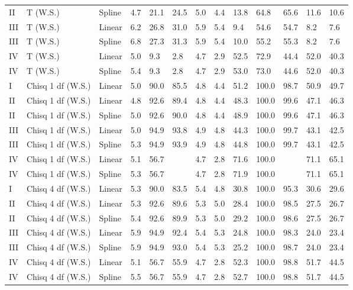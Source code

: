 \documentclass{article}\usepackage[]{graphicx}\usepackage[]{color}
\begin{document}
\begin{table}[ht]
\begin{tabular}{lll|lllll|lllll}
  II & T (W.S.) & Spline & 4.7 & 21.1 & 24.5 & 5.0 & 4.4 & 13.8 & 64.8 & 65.6 & 11.6 & 10.6 \\ 
  III & T (W.S.) & Linear & 6.2 & 26.8 & 31.0 & 5.9 & 5.4 & 9.4 & 54.6 & 54.7 & 8.2 & 7.6 \\ 
  III & T (W.S.) & Spline & 6.8 & 27.3 & 31.3 & 5.9 & 5.4 & 10.0 & 55.2 & 55.3 & 8.2 & 7.6 \\ 
  IV & T (W.S.) & Linear & 5.0 & 9.3 & 2.8 & 4.7 & 2.9 & 52.5 & 72.9 & 44.4 & 52.0 & 40.3 \\ 
  IV & T (W.S.) & Spline & 5.4 & 9.3 & 2.8 & 4.7 & 2.9 & 53.0 & 73.0 & 44.6 & 52.0 & 40.3 \\ 
   \hline
I & Chisq 1 df (W.S.) & Linear & 5.0 & 90.0 & 85.5 & 4.8 & 4.4 & 51.2 & 100.0 & 98.7 & 50.9 & 49.7 \\ 
  II & Chisq 1 df (W.S.) & Linear & 4.8 & 92.6 & 89.4 & 4.8 & 4.4 & 48.3 & 100.0 & 99.6 & 47.1 & 46.3 \\ 
  II & Chisq 1 df (W.S.) & Spline & 5.0 & 92.6 & 90.0 & 4.8 & 4.4 & 48.9 & 100.0 & 99.6 & 47.1 & 46.3 \\ 
  III & Chisq 1 df (W.S.) & Linear & 5.0 & 94.9 & 93.8 & 4.9 & 4.8 & 44.3 & 100.0 & 99.7 & 43.1 & 42.5 \\ 
  III & Chisq 1 df (W.S.) & Spline & 5.3 & 94.9 & 93.9 & 4.9 & 4.8 & 44.8 & 100.0 & 99.7 & 43.1 & 42.5 \\ 
  IV & Chisq 1 df (W.S.) & Linear & 5.1 & 56.7 &  & 4.7 & 2.8 & 71.6 & 100.0 &  & 71.1 & 65.1 \\ 
  IV & Chisq 1 df (W.S.) & Spline & 5.3 & 56.7 &  & 4.7 & 2.8 & 71.9 & 100.0 &  & 71.1 & 65.1 \\ 
   \hline
I & Chisq 4 df (W.S.) & Linear & 5.3 & 90.0 & 83.5 & 5.4 & 4.8 & 30.8 & 100.0 & 95.3 & 30.6 & 29.6 \\ 
  II & Chisq 4 df (W.S.) & Linear & 5.3 & 92.6 & 89.6 & 5.3 & 5.0 & 28.4 & 100.0 & 98.5 & 27.5 & 26.7 \\ 
  II & Chisq 4 df (W.S.) & Spline & 5.4 & 92.6 & 89.9 & 5.3 & 5.0 & 29.2 & 100.0 & 98.6 & 27.5 & 26.7 \\ 
  III & Chisq 4 df (W.S.) & Linear & 5.9 & 94.9 & 92.4 & 5.4 & 5.3 & 24.8 & 100.0 & 98.3 & 24.0 & 23.4 \\ 
  III & Chisq 4 df (W.S.) & Spline & 5.9 & 94.9 & 93.0 & 5.4 & 5.3 & 25.2 & 100.0 & 98.7 & 24.0 & 23.4 \\ 
  IV & Chisq 4 df (W.S.) & Linear & 5.1 & 56.7 & 55.9 & 4.7 & 2.8 & 52.3 & 100.0 & 98.8 & 51.7 & 44.5 \\ 
  IV & Chisq 4 df (W.S.) & Spline & 5.5 & 56.7 & 55.9 & 4.7 & 2.8 & 52.7 & 100.0 & 98.8 & 51.7 & 44.5 \\ 
   \hline
\end{tabular}
\end{table}
\end{document}
